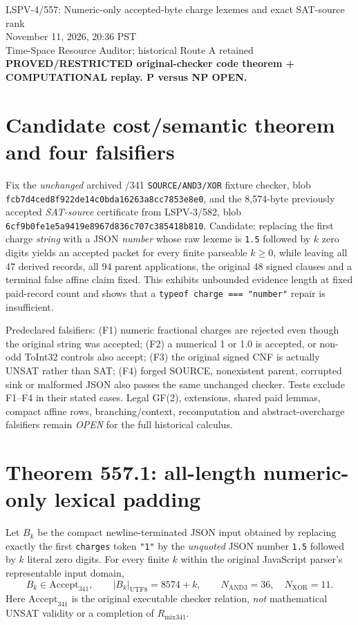 \documentclass[11pt]{article}
\begin{document}
\begin{center}
{\Large LSPV-4/557: Numeric-only accepted-byte charge lexemes and exact SAT-source rank}\\[3pt]
November 11, 2026, 20:36 PST\\
Time-Space Resource Auditor; historical Route A retained\\
\textbf{PROVED/RESTRICTED original-checker code theorem + COMPUTATIONAL replay. P versus NP OPEN.}
\end{center}

\section*{Candidate cost/semantic theorem and four falsifiers}
Fix the \emph{unchanged} archived /341 \texttt{SOURCE/AND3/XOR} fixture checker, blob
\texttt{fcb7d4ced8f922de14c0bda16263a8cc7853e8e0}, and the
8,574-byte previously accepted \emph{SAT-source} certificate from LSPV-3/582, blob
\texttt{6cf9b0fe1e5a9419e8967d836c707c385418b810}.
Candidate: replacing the first charge \emph{string} with a JSON \emph{number} whose raw
lexeme is \texttt{1.5} followed by $k$ zero digits yields an accepted packet
for every finite parseable $k\ge0$, while leaving all 47 derived records, all
94 parent applications, the original 48 signed clauses and a terminal false
affine claim fixed. This exhibits unbounded evidence length at fixed paid-record
count and shows that a \texttt{typeof charge === "number"} repair is insufficient.

Predeclared falsifiers: (F1) numeric fractional charges are rejected even though
the original string was accepted; (F2) a numerical 1 or 1.0 is accepted, or
non-odd ToInt32 controls also accept; (F3) the original signed CNF is actually
UNSAT rather than SAT; (F4) forged SOURCE, nonexistent parent, corrupted sink or
malformed JSON also passes the same unchanged checker. Tests exclude F1--F4 in
their stated cases. Legal GF(2), extensions, shared paid lemmas, compact affine
rows, branching/context, recomputation and abstract-overcharge falsifiers
remain \emph{OPEN} for the full historical calculus.

\section*{Theorem 557.1: all-length numeric-only lexical padding}
Let $B_k$ be the compact newline-terminated JSON input obtained by replacing
exactly the first \texttt{charges} token \texttt{"1"} by the \emph{unquoted}
JSON number \texttt{1.5} followed by $k$ literal zero digits.
For every finite $k$ within the original JavaScript parser's representable
input domain,
\[
 \boxed{B_k\in\mathrm{Accept}_{341},\qquad
        |B_k|_{\mathrm{UTF8}}=8574+k,\qquad
        N_{\mathrm{AND3}}=36,\quad N_{\mathrm{XOR}}=11.}
\]
Here \(\mathrm{Accept}_{341}\) is the original executable checker relation,
\emph{not} mathematical UNSAT validity or a completion of $R_{\mathrm{mix341}}$.
\end{document}
